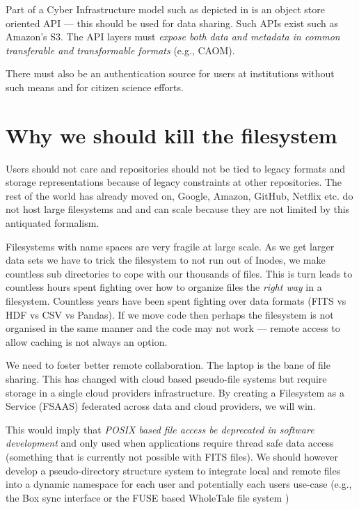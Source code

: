 Part of a Cyber Infrastructure model such as depicted in  is an object store oriented \gls{API} --- this should be used for data sharing. Such APIs exist such as Amazon's S3.
The  \gls{API} layers must \emph{expose both data and \gls{metadata} in common
transferable and transformable formats} (e.g., \gls{CAOM}).


There must also be an authentication source for users at institutions without such means and for citizen science efforts.

\section{Why we should kill the filesystem}

Users should not care and repositories should not be tied to legacy formats  and storage representations because of legacy constraints  at other repositories.
The rest of the world has already moved on,  Google, Amazon, GitHub, Netflix etc. do not host large filesystems and and can scale because they are not limited by this antiquated formalism.

Filesystems with name spaces are very fragile at large scale. As we get larger data sets we have to trick the filesystem to not run out of Inodes, we make countless sub directories to cope with our thousands of files.
This is turn leads to countless hours spent fighting over how to organize files  the \emph{right way} in a filesystem.
Countless years have been spent fighting over data formats (\gls{FITS} vs \gls{HDF} \citep{2015ASPC..495...11M} vs \gls{CSV} vs Pandas).
If we move code then perhaps the filesystem is not organised in the same manner and the code may not work --- remote access to allow caching is not always an option.

We need to foster better remote collaboration.  The laptop is the bane of file sharing.
This has changed with cloud based pseudo-file systems but require storage in a single
cloud providers infrastructure. By creating a Filesystem as a Service (\gls{FSAAS}) federated
across data and cloud providers, we will win.

This would imply that \emph{POSIX based file access be deprecated
in software development} and only used when applications require thread safe
data access (something that is currently not possible with \gls{FITS} files).
We should however  develop a pseudo-directory structure system to
integrate local and remote files into a dynamic namespace for each user and potentially
each users use-case (e.g., the Box sync interface or the \gls{FUSE} based WholeTale file system
\citep{BRINCKMAN2019854})

